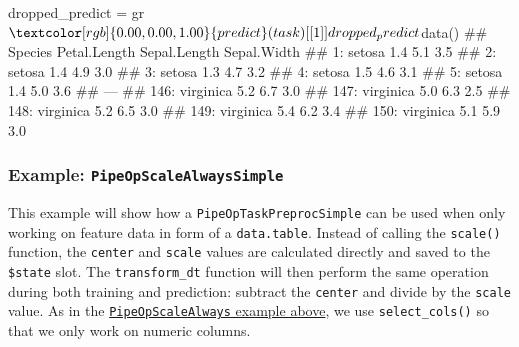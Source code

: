 \documentclass[12pt,]{scrbook}
\newenvironment{Shaded}{}{}
\newcommand{\DecValTok}[1]{#1}
\newcommand{\KeywordTok}[1]{\textcolor[rgb]{0.00,0.00,1.00}{#1}}
\newcommand{\NormalTok}[1]{#1}
\newcommand{\OperatorTok}[1]{#1}
\newcommand{\StringTok}[1]{\textcolor[rgb]{0.00,0.50,0.50}{#1}}
\begin{document}
\begin{Shaded}
\begin{Highlighting}[]
\NormalTok{dropped_predict =}\StringTok{ }\NormalTok{gr}\OperatorTok{$}\KeywordTok{predict}\NormalTok{(task)[[}\DecValTok{1}\NormalTok{]]}

\NormalTok{dropped_predict}\OperatorTok{$}\KeywordTok{data}\NormalTok{()}
\NormalTok{##        Species Petal.Length Sepal.Length Sepal.Width}
\NormalTok{##   1:    setosa          1.4          5.1         3.5}
\NormalTok{##   2:    setosa          1.4          4.9         3.0}
\NormalTok{##   3:    setosa          1.3          4.7         3.2}
\NormalTok{##   4:    setosa          1.5          4.6         3.1}
\NormalTok{##   5:    setosa          1.4          5.0         3.6}
\NormalTok{##  ---                                                }
\NormalTok{## 146: virginica          5.2          6.7         3.0}
\NormalTok{## 147: virginica          5.0          6.3         2.5}
\NormalTok{## 148: virginica          5.2          6.5         3.0}
\NormalTok{## 149: virginica          5.4          6.2         3.4}
\NormalTok{## 150: virginica          5.1          5.9         3.0}
\end{Highlighting}
\end{Shaded}

\hypertarget{example-pipeopscalealwayssimple}{%
\subsubsection{\texorpdfstring{Example: \texttt{PipeOpScaleAlwaysSimple}}{Example: PipeOpScaleAlwaysSimple}}\label{example-pipeopscalealwayssimple}}

This example will show how a \texttt{PipeOpTaskPreprocSimple} can be used when only working on feature data in form of a \texttt{data.table}.
Instead of calling the \texttt{scale()} function, the \texttt{center} and \texttt{scale} values are calculated directly and saved to the \texttt{\$state} slot.
The \texttt{transform\_dt} function will then perform the same operation during both training and prediction: subtract the \texttt{center} and divide by the \texttt{scale} value.
As in the \protect\hyperlink{example-pipeopscalealways}{\texttt{PipeOpScaleAlways} example above}, we use \texttt{select\_cols()} so that we only work on numeric columns.
\end{document}
